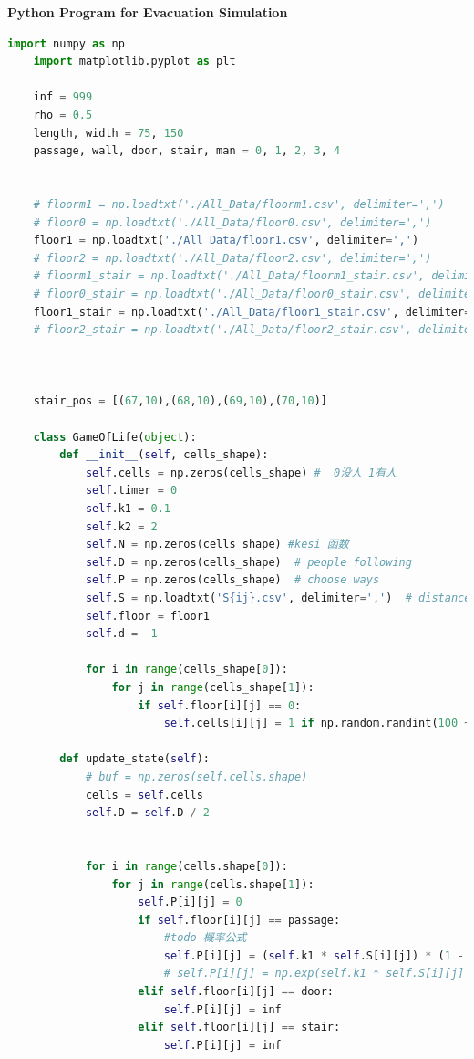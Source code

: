 \documentclass{mcmthesis}
\begin{document}
\noindent\textbf{\Large{Python Program for Evacuation Simulation}}
\lstset{
basicstyle=\sffamily,
keywordstyle=\bfseries,
commentstyle=\rmfamily\itshape,
stringstyle=\ttfamily,
flexiblecolumns,
numbers=left,
numberstyle=\footnotesize}
\begin{lstlisting}[language=Python]  
    import numpy as np
    import matplotlib.pyplot as plt
    
    inf = 999
    rho = 0.5
    length, width = 75, 150
    passage, wall, door, stair, man = 0, 1, 2, 3, 4
    
    
    # floorm1 = np.loadtxt('./All_Data/floorm1.csv', delimiter=',')
    # floor0 = np.loadtxt('./All_Data/floor0.csv', delimiter=',')
    floor1 = np.loadtxt('./All_Data/floor1.csv', delimiter=',')
    # floor2 = np.loadtxt('./All_Data/floor2.csv', delimiter=',')
    # floorm1_stair = np.loadtxt('./All_Data/floorm1_stair.csv', delimiter=',')
    # floor0_stair = np.loadtxt('./All_Data/floor0_stair.csv', delimiter=',')
    floor1_stair = np.loadtxt('./All_Data/floor1_stair.csv', delimiter=',')
    # floor2_stair = np.loadtxt('./All_Data/floor2_stair.csv', delimiter=',')
    
    
    
    stair_pos = [(67,10),(68,10),(69,10),(70,10)]
    
    class GameOfLife(object):
        def __init__(self, cells_shape):
            self.cells = np.zeros(cells_shape) #  0没人 1有人
            self.timer = 0
            self.k1 = 0.1
            self.k2 = 2
            self.N = np.zeros(cells_shape) #kesi 函数
            self.D = np.zeros(cells_shape)  # people following
            self.P = np.zeros(cells_shape)  # choose ways
            self.S = np.loadtxt('S{ij}.csv', delimiter=',')  # distance
            self.floor = floor1
            self.d = -1
    
            for i in range(cells_shape[0]):
                for j in range(cells_shape[1]):
                    if self.floor[i][j] == 0:
                        self.cells[i][j] = 1 if np.random.randint(100 + 100 * rho) / 100 > 1 else 0
    
        def update_state(self):
            # buf = np.zeros(self.cells.shape)
            cells = self.cells
            self.D = self.D / 2
    
    
            for i in range(cells.shape[0]):
                for j in range(cells.shape[1]):
                    self.P[i][j] = 0
                    if self.floor[i][j] == passage:
                        #todo 概率公式
                        self.P[i][j] = (self.k1 * self.S[i][j]) * (1 - cells[i][j]) * (1- self.N[i][j])
                        # self.P[i][j] = np.exp(self.k1 * self.S[i][j] + self.k2 * self.D[i][j])
                    elif self.floor[i][j] == door:
                        self.P[i][j] = inf
                    elif self.floor[i][j] == stair:
                        self.P[i][j] = inf
    

\end{lstlisting}
\end{document}
